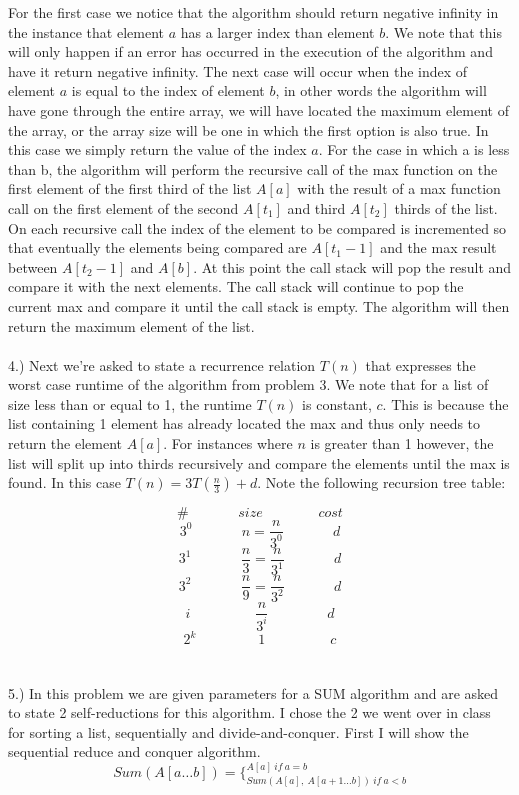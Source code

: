 \documentclass[paper=a4, 11pt]{scrartcl}
\begin{document}
For the first case we notice that the algorithm should return negative infinity in the instance that element $a$ has a larger index than element $b$. We note that this will only happen if an error has occurred in the execution of the algorithm and have it return negative infinity. The next case will occur when the index of element $a$ is equal to the index of element $b$, in other words the algorithm will have gone through the entire array, we will have located the maximum element of the array, or the array size will be one in which the first option is also true. In this case we simply return the value of the index $a$. For the case in which a is less than b, the algorithm will perform the recursive call of the max function on the first element of the first third of the list $A[a]$ with the result of a max function call on the first element of the second $A[t_1]$ and third $A[t_2]$ thirds of the list. On each recursive call the index of the element to be compared is incremented so that eventually the elements being compared are $A[t_1-1]$ and the max result between $A[t_2-1]$ and $A[b]$. At this point the call stack will pop the result and compare it with the next elements. The call stack will continue to pop the current max and compare it until the call stack is empty. The algorithm will then return the maximum element of the list.\\ \\
4.) Next we're asked to state a recurrence relation $T(n)$ that expresses the worst case runtime of the algorithm from problem 3. We note that for a list of size less than or equal to 1, the runtime $T(n)$ is constant, $c$. This is because the list containing 1 element has already located the max and thus only needs to return the element $A[a]$. For instances where $n$ is greater than 1 however, the list will split up into thirds recursively and compare the elements until the max is found. In this case $T(n)=3T(\frac{n}{3})+d$. Note the following recursion tree table:

$$\#\ \ \ \ \ \ \ \ \ \ \ \ \ \ \ \ size\ \ \ \ \ \ \ \ \ \ \ \ \ \ \ \ \ \ cost$$ 
$$3^0\ \ \ \ \ \ \ \ \ \ \ \ \ \ \ \ n=\frac{n}{3^0}\ \ \ \ \ \ \ \ \ \ \ \ \ \ \ \ d$$
$$3^1\ \ \ \ \ \ \ \ \ \ \ \ \ \ \ \ \frac{n}{3}=\frac{n}{3^1}\ \ \ \ \ \ \ \ \ \ \ \ \ \ \ \ d$$
$$3^2\ \ \ \ \ \ \ \ \ \ \ \ \ \ \ \ \frac{n}{9}=\frac{n}{3^2}\ \ \ \ \ \ \ \ \ \ \ \ \ \ \ \ d$$
$$i\ \ \ \ \ \ \ \ \ \ \ \ \ \ \ \ \ \ \ \ \ \frac{n}{3^i}\ \ \ \ \ \ \ \ \ \ \ \ \ \ \ \ \ \ \ d$$
$$ 2^{k}\ \ \ \ \ \ \ \ \ \ \ \ \ \ \ \ \ \ \ \ 1\ \ \ \ \ \ \ \ \ \ \ \ \ \ \ \ \ \ \ \ \ c$$\\ \\
5.) In this problem we are given parameters for a SUM algorithm and are asked to state 2 self-reductions for this algorithm. I chose the 2 we went over in class for sorting a list, sequentially and divide-and-conquer. First I will show the sequential reduce and conquer algorithm.
$$Sum(A[a \dots b])=\Bigg\{^{A[a]\ if\ a=b}_{Sum(A[a],\ A[a+1 \dots b])\ if\ a<b}$$
\end{document}
